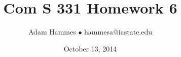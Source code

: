 \documentclass[11pt]{article}
\begin{document}
\title{Com S 331 Homework 6}
\author{Adam Hammes $\bullet$ hammesa@iastate.edu}
\date{October 13, 2014}
\maketitle
\end{document}
